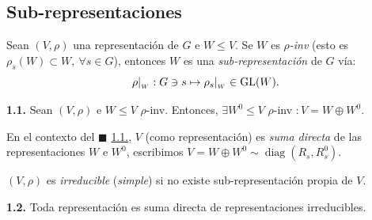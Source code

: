 \subsection*{Sub-representaciones}

\begin{definition}
    Sean \((V, \rho)\) una representación de \(G\) e \(W \leq V\). Se \(W\) es \emph{\(\rho\)-inv} (esto es \(\rho_s(W) \subset W, \ \forall s \in G\)), entonces \(W\) es una \emph{sub-representación} de \(G\) vía: 
    \[\rho|_{_W}: G\ni s \mapsto \rho_s|_{_W} \in \operatorname{GL}(W).\]     
\end{definition}

\begin{theorem}
    \textbf{1.1.} Sean \((V,\rho)\) e \(W\leq V\) \(\rho\)-inv. Entonces, \(\exists W^0 \leq V\) \(\rho\)-inv \(: V = W \oplus W^0\). 
\end{theorem}


\begin{note}
    En el contexto del \(\blacksquare\) \hyperlink{thm1}{1.1.}, \(V\) (como representación) es \emph{suma directa} de las representaciones \(W\) e \(W^0\), escribimos \(V= W \oplus W^0 \sim \operatorname{diag}(R_s , R_s^0)\).
\end{note}


\begin{definition}
    \((V, \rho )\) es \emph{irreducible} (\emph{simple}) si no existe sub-representación propia de \(V\). %
\end{definition}

\begin{theorem}
    \textbf{1.2.} Toda representación es suma directa de representaciones irreducibles. 
\end{theorem}

